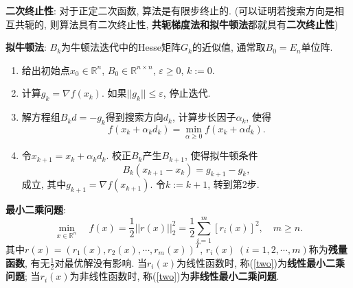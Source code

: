 \documentclass[12pt, a4paper, oneside]{ctexart}
\let\leq=\leqslant %
\let\geq=\geqslant %
\def\R{\mathbb{R}}          %
\begin{document}
\textbf{二次终止性}: 对于正定二次函数, 算法是有限步终止的. (可以证明若搜索方向是相互共轭的, 则算法具有二次终止性, \textbf{共轭梯度法和拟牛顿法}都就具有\textbf{二次终止性})

\textbf{拟牛顿法}: $B_k$为牛顿法迭代中的Hesse矩阵$G_k$的近似值, 通常取$B_0 = E_n$单位阵.
\begin{enumerate}
    \item 给出初始点$x_0\in \R^n$, $B_0\in \R^{n\times n}$, $\varepsilon\geq 0$, $k:=0$.
    \item 计算$g_k = \nabla f(x_k)$. 如果$||g_k|| \leq \varepsilon$, 停止迭代.
    \item 解方程组$B_kd = -g_k$得到搜索方向$d_k$, 计算步长因子$\alpha_k$, 使得
    \begin{equation*}
        f(x_k+\alpha_kd_k) = \min_{\alpha \geq 0} f(x_k+\alpha d_k).
    \end{equation*}
    \item 令$x_{k+1} = x_k + \alpha_k d_k$. 校正$B_k$产生$B_{k+1}$, 使得拟牛顿条件
    \begin{equation*}
        B_k(x_{k+1}-x_k) = g_{k+1} - g_k,
    \end{equation*}
    成立, 其中$g_{k+1} = \nabla f(x_{k+1})$. 令$k:=k+1$, 转到第2步.
\end{enumerate}

\textbf{最小二乘问题}:
\begin{equation}\label{two}
    \min_{x\in\R^n}\quad f(x) = \frac{1}{2}||r(x)||_2^2 = \frac{1}{2}\sum_{i=1}^m[r_i(x)]^2,\quad m\geq n.
\end{equation}
其中$r(x) = (r_1(x), r_2(x),\cdots, r_m(x))^T$, $r_i(x)\ (i=1,2,\cdots, m)$称为\textbf{残量函数}, 有无$\frac{1}{2}$对最优解没有影响. 当$r_i(x)$为线性函数时, 称(\ref{two})为\textbf{线性最小二乘问题}; 当$r_i(x)$为非线性函数时, 称(\ref{two})为\textbf{非线性最小二乘问题}.
\end{document}
